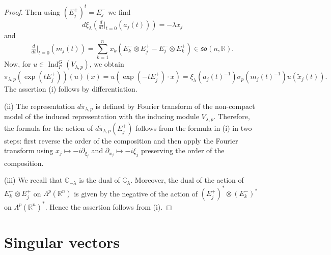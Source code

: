 \documentclass[a4paper,12pt,reqno]{amsart}
\numberwithin{theorem}{subsection}
\numberwithin{equation}{section}
\begin{document}
\begin{proof}
Then using $(E_j^+)^t = E_j^-$ we find
\begin{equation*}
   {d} \xi_\lambda \left(\tfrac{d}{dt}|_{t=0}(a_j(t))\right) = - \lambda x_j
\end{equation*}
and
\begin{equation}\label{eq:algebraicAction}
   \tfrac{d}{dt}|_{t=0}(m_j(t)) = \sum_{k=1}^n x_k (E^-_k \otimes E_j^+ - E_j^-\otimes E_k^+)
   \in \mathfrak{so}(n,{\mathbb{R}}).
\end{equation}
Now, for $u \in {\operatorname{Ind}}_P^G(V_{\lambda,p})$, we obtain
\begin{equation*}
   \pi_{\lambda,p}(\exp(tE_j^+))(u)(x) = u(\exp(-tE_j^+) \cdot x)
   = \xi_{\lambda}(a_j(t)^{-1}) \sigma_p(m_j(t)^{-1}) u(\tilde{x}_j(t)).
\end{equation*}
The assertion (i) follows by differentiation.

(ii) The representation ${d} \tilde{\pi}_{\lambda,p}$ is defined by Fourier
transform of the non-compact model of the induced representation with the
inducing module $V_{\lambda,p}$. Therefore, the formula for the action of ${d}
\tilde{\pi}_{\lambda,p}(E_j^+)$ follows from the formula in (i) in two steps:
first reverse the order of the composition and then apply the Fourier transform
using $x_j \mapsto -i\partial_{\xi_j}$ and $\partial_{x_j} \mapsto -i\xi_j$
preserving the order of the composition.

(iii) We recall that ${\mathbb{C}}_{-\lambda}$ is the dual of ${\mathbb{C}}_\lambda$. Moreover, the
dual of the action of $E_k^- \otimes E_j^+$ on $\Lambda^p({\mathbb{R}}^n)$ is given by
the negative of the action of $(E_j^+)^* \otimes(E_k^-)^*$ on
$\Lambda^p({\mathbb{R}}^n)^*$. Hence the assertion follows from (i).
\end{proof}

\section{Singular vectors}\label{SingularVectors}
\end{document}
